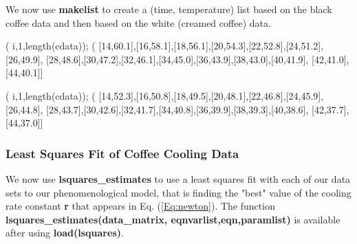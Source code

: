 \documentclass[11pt]{article}
\newcommand{\tcbr}{\textcolor{BrickRed}}
\begin{document}
We now use \textbf{makelist} to create a (time, temperature) list based on the
  \tcbr{black} coffee data and then based on the \tcbr{white} (creamed coffee) data.
\begin{myVerbatim}
(%
                       i,1,length(cdata));
(%
       [14,60.1],[16,58.1],[18,56.1],[20,54.3],[22,52.8],[24,51.2],[26,49.9],
       [28,48.6],[30,47.2],[32,46.1],[34,45.0],[36,43.9],[38,43.0],[40,41.9],
       [42,41.0],[44,40.1]]
\end{myVerbatim}
\newpage
\begin{myVerbatim}
(%
                       i,1,length(cdata));
(%
       [14,52.3],[16,50.8],[18,49.5],[20,48.1],[22,46.8],[24,45.9],[26,44.8],
       [28,43.7],[30,42.6],[32,41.7],[34,40.8],[36,39.9],[38,39.3],[40,38.6],
       [42,37.7],[44,37.0]]
\end{myVerbatim}
\subsubsection{Least Squares Fit of Coffee Cooling Data}
We now use \textbf{lsquares\_estimates} to use a least squares fit with
  each of our data sets to our phenomenological model, that is finding
  the "best" value of the cooling rate constant \textbf{r} that appears
  in Eq. (\ref{Eq:newton}).
The function \textbf{lsquares\_estimates(data\_matrix, eqnvarlist,eqn,paramlist)}
  is available after using \textbf{load(lsquares)}.\\
\end{document}
